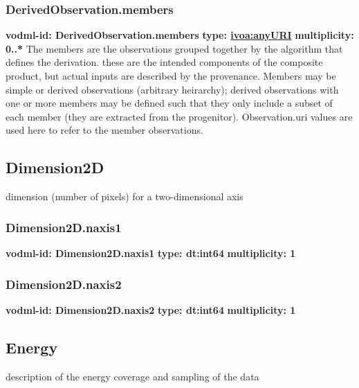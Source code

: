     \subsubsection{DerivedObservation.members}
      \textbf{vodml-id: DerivedObservation.members} \newline
      \textbf{type: \hyperref[sect:ivoa]{ivoa:anyURI}} \newline
      \textbf{multiplicity: 0..*} \newline
      The members are the observations grouped together by the algorithm that defines the derivation. these are the intended components of the composite product, but actual inputs are described by the provenance. Members may be simple or derived observations (arbitrary heirarchy); derived observations with one or more members may be defined such that they only include a subset of each member (they are extracted from the progenitor). Observation.uri values are used here to refer to the member observations.

  \subsection{Dimension2D}
  \label{sect:Dimension2D}
    dimension (number of pixels) for a two-dimensional axis

    \subsubsection{Dimension2D.naxis1}
      \textbf{vodml-id: Dimension2D.naxis1} \newline
      \textbf{type: dt:int64} \newline
      \textbf{multiplicity: 1} 

    \subsubsection{Dimension2D.naxis2}
      \textbf{vodml-id: Dimension2D.naxis2} \newline
      \textbf{type: dt:int64} \newline
      \textbf{multiplicity: 1} 

  \subsection{Energy}
  \label{sect:Energy}
    description of the energy coverage and sampling of the data

